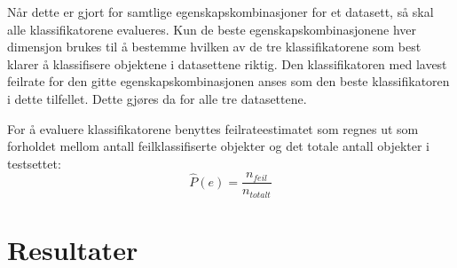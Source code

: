 \documentclass[twocolumn,norwegian]{article}
\begin{document}
Når dette er gjort for samtlige egenskapskombinasjoner for et datasett, så skal alle klassifikatorene evalueres. Kun de beste egenskapskombinasjonene hver dimensjon brukes til å bestemme hvilken av de tre klassifikatorene som best klarer å klassifisere objektene i datasettene riktig. Den klassifikatoren med lavest feilrate for den gitte egenskapskombinasjonen anses som den beste klassifikatoren i dette tilfellet. Dette gjøres da for alle tre datasettene.

For å evaluere klassifikatorene benyttes feilrateestimatet som regnes ut som forholdet mellom antall feilklassifiserte objekter og det totale antall objekter i testsettet:
\begin{equation}
	\hat{P}(e) = \frac{n_{feil}}{n_{totalt}}
\end{equation}


\section{Resultater}
\end{document}
